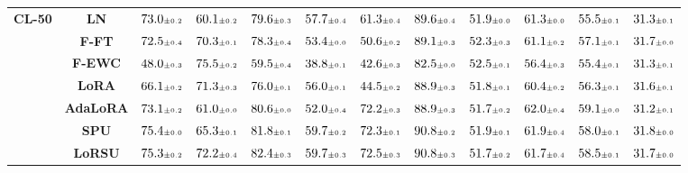 \begin{table}
\begin{center}
\begin{small}
\begin{tabular}{l c c c c c c c c c c c}
\midrule
\multirow{7}{*}{\textbf{CL-50}} & \textbf{LN} & $73.0 \mtiny{\pm 0.2}$ & $60.1 \mtiny{\pm 0.2}$ & $79.6 \mtiny{\pm 0.3}$ & $57.7 \mtiny{\pm 0.4}$ & $61.3 \mtiny{\pm 0.4}$ & $89.6 \mtiny{\pm 0.4}$ & $51.9 \mtiny{\pm 0.0}$ & $61.3 \mtiny{\pm 0.0}$ & $55.5 \mtiny{\pm 0.1}$ & $31.3 \mtiny{\pm 0.1}$ \\
& \textbf{F-FT} & $72.5 \mtiny{\pm 0.4}$ & $70.3 \mtiny{\pm 0.1}$ & $78.3 \mtiny{\pm 0.4}$ & $53.4 \mtiny{\pm 0.0}$ & $50.6 \mtiny{\pm 0.2}$ & $89.1 \mtiny{\pm 0.3}$ & $52.3 \mtiny{\pm 0.3}$ & $61.1 \mtiny{\pm 0.2}$ & $57.1 \mtiny{\pm 0.1}$ & $31.7 \mtiny{\pm 0.0}$ \\
& \textbf{F-EWC} & $48.0 \mtiny{\pm 0.3}$ & $75.5 \mtiny{\pm 0.2}$ & $59.5 \mtiny{\pm 0.4}$ & $38.8 \mtiny{\pm 0.1}$ & $42.6 \mtiny{\pm 0.3}$ & $82.5 \mtiny{\pm 0.0}$ & $52.5 \mtiny{\pm 0.1}$ & $56.4 \mtiny{\pm 0.3}$ & $55.4 \mtiny{\pm 0.1}$ & $31.3 \mtiny{\pm 0.1}$ \\
& \textbf{LoRA} & $66.1 \mtiny{\pm 0.2}$ & $71.3 \mtiny{\pm 0.3}$ & $76.0 \mtiny{\pm 0.1}$ & $56.0 \mtiny{\pm 0.1}$ & $44.5 \mtiny{\pm 0.2}$ & $88.9 \mtiny{\pm 0.3}$ & $51.8 \mtiny{\pm 0.1}$ & $60.4 \mtiny{\pm 0.2}$ & $56.3 \mtiny{\pm 0.1}$ & $31.6 \mtiny{\pm 0.1}$ \\
& \textbf{AdaLoRA} & $73.1 \mtiny{\pm 0.2}$ & $61.0 \mtiny{\pm 0.0}$ & $80.6 \mtiny{\pm 0.0}$ & $52.0 \mtiny{\pm 0.4}$ & $72.2 \mtiny{\pm 0.3}$ & $88.9 \mtiny{\pm 0.3}$ & $51.7 \mtiny{\pm 0.2}$ & $62.0 \mtiny{\pm 0.4}$ & $59.1 \mtiny{\pm 0.0}$ & $31.2 \mtiny{\pm 0.1}$ \\
& \textbf{SPU} & $75.4 \mtiny{\pm 0.0}$ & $65.3 \mtiny{\pm 0.1}$ & $81.8 \mtiny{\pm 0.1}$ & $59.7 \mtiny{\pm 0.2}$ & $72.3 \mtiny{\pm 0.1}$ & $90.8 \mtiny{\pm 0.2}$ & $51.9 \mtiny{\pm 0.1}$ & $61.9 \mtiny{\pm 0.4}$ & $58.0 \mtiny{\pm 0.1}$ & $31.8 \mtiny{\pm 0.0}$ \\
& \textbf{LoRSU} & $75.3 \mtiny{\pm 0.2}$ & $72.2 \mtiny{\pm 0.4}$ & $82.4 \mtiny{\pm 0.3}$ & $59.7 \mtiny{\pm 0.3}$ & $72.5 \mtiny{\pm 0.3}$ & $90.8 \mtiny{\pm 0.3}$ & $51.7 \mtiny{\pm 0.2}$ & $61.7 \mtiny{\pm 0.4}$ & $58.5 \mtiny{\pm 0.1}$ & $31.7 \mtiny{\pm 0.0}$ \\
\bottomrule
\end{tabular}
\endgroup
\end{small}
\end{center}
\vskip -0.1in
\end{table}


